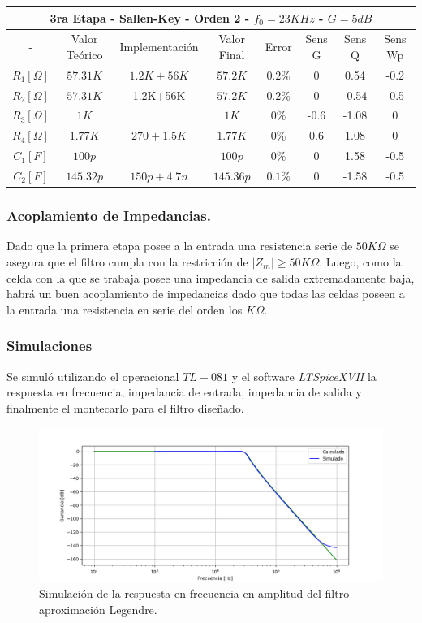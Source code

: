 \begin{table}[H]
\centering
\begin{tabular}{@{}cccccccc@{}}
\multicolumn{8}{c}{3ra Etapa - Sallen-Key - Orden 2 - $f_0 = 23KHz$ - $G=5dB$} \\ \midrule
- & Valor Teórico & Implementación & Valor Final & Error & Sens G & Sens Q & Sens Wp \\ \midrule
$R_1 [\Omega]$ & $57.31K$ & $1.2K+56K$ & $57.2K$ & $0.2\%$ & 0 & 0.54 & -0.2 \\
$R_2 [\Omega]$ & $57.31K$ & 1.2K+56K & $57.2K$ & $0.2\%$ & 0 & -0.54 & -0.5 \\
$R_3 [\Omega]$ & $1K$ &  & $1K$ & $0\%$ & -0.6 & -1.08 & 0 \\
$R_4 [\Omega]$ & $1.77K$ & $270+1.5K$ & $1.77K$ & $0\%$ & 0.6 & 1.08 & 0 \\
$C_1 [F]$ & $100p$ &  & $100p$ & $0\%$ & 0 & 1.58 & -0.5 \\
$C_2 [F]$ & $145.32p$ & $150p+4.7n$ & $145.36p$ & $0.1\%$ & 0 & -1.58 & -0.5 \\ \bottomrule
\end{tabular}
\end{table}

\subsubsection{Acoplamiento de Impedancias.}
Dado que la primera etapa posee a la entrada una resistencia serie de $50K\Omega$ se asegura que el filtro cumpla con la restricción de $|Z_{in}| \geq 50K\Omega$. Luego, como la celda con la que se trabaja posee una impedancia de salida extremadamente baja, habrá un buen acoplamiento de impedancias dado que todas las celdas poseen a la entrada una resistencia en serie del orden los $K\Omega$.

\subsubsection{Simulaciones}

Se simuló utilizando el operacional $TL-081$ y el software \textit{LTSpiceXVII} la respuesta en frecuencia, impedancia de entrada, impedancia de salida y finalmente el montecarlo para el filtro diseñado.

\begin{figure}[H]
\centering
	\centering
	\includegraphics[width=\textwidth]{Imagenes-Ej1/legendre_hs_sim.png}
	\caption{Simulación de la respuesta en frecuencia en amplitud del filtro aproximación Legendre.}
	\label{leg_gain_sim}
\end{figure}

